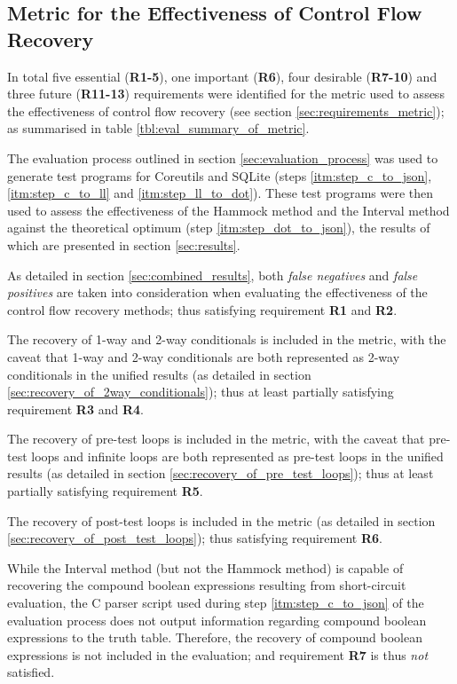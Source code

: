 
\subsection{Metric for the Effectiveness of Control Flow Recovery}
\label{sec:evaluation_metric}

In total five essential (\textbf{R1-5}), one important (\textbf{R6}), four desirable (\textbf{R7-10}) and three future (\textbf{R11-13}) requirements were identified for the metric used to assess the effectiveness of control flow recovery (see section \ref{sec:requirements_metric}); as summarised in table \ref{tbl:eval_summary_of_metric}.

The evaluation process outlined in section \ref{sec:evaluation_process} was used to generate test programs for Coreutils and SQLite (steps \ref{itm:step_c_to_json}, \ref{itm:step_c_to_ll} and \ref{itm:step_ll_to_dot}). These test programs were then used to assess the effectiveness of the Hammock method and the Interval method against the theoretical optimum (step \ref{itm:step_dot_to_json}), the results of which are presented in section \ref{sec:results}.

As detailed in section \ref{sec:combined_results}, both \textit{false negatives} and \textit{false positives} are taken into consideration when evaluating the effectiveness of the control flow recovery methods; thus satisfying requirement \textbf{R1} and \textbf{R2}.

The recovery of 1-way and 2-way conditionals is included in the metric, with the caveat that 1-way and 2-way conditionals are both represented as 2-way conditionals in the unified results (as detailed in section \ref{sec:recovery_of_2way_conditionals}); thus at least partially satisfying requirement \textbf{R3} and \textbf{R4}.

The recovery of pre-test loops is included in the metric, with the caveat that pre-test loops and infinite loops are both represented as pre-test loops in the unified results (as detailed in section \ref{sec:recovery_of_pre_test_loops}); thus at least partially satisfying requirement \textbf{R5}.

The recovery of post-test loops is included in the metric (as detailed in section \ref{sec:recovery_of_post_test_loops}); thus satisfying requirement \textbf{R6}.

While the Interval method (but not the Hammock method) is capable of recovering the compound boolean expressions resulting from short-circuit evaluation, the C parser script used during step \ref{itm:step_c_to_json} of the evaluation process does not output information regarding compound boolean expressions to the truth table. Therefore, the recovery of compound boolean expressions is not included in the evaluation; and requirement \textbf{R7} is thus \textit{not} satisfied.

